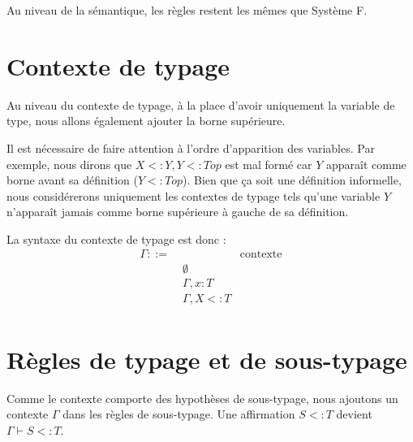 Au niveau de la sémantique, les règles restent les mêmes que Système F.

\label{eval:system-f-sub}

\section{Contexte de typage}

Au niveau du contexte de typage, à la place d'avoir uniquement la variable de
type, nous allons également ajouter la borne supérieure.

Il est nécessaire de faire attention à l'ordre d'apparition des variables. Par
exemple, nous dirons que $X <: Y, Y <: Top$ est mal formé car $Y$
apparaît comme borne avant sa définition ($Y <: Top$). Bien que ça soit une
définition informelle, nous considérerons uniquement les contextes de typage
tels qu'une variable $Y$ n'apparaît jamais comme borne supérieure à gauche de sa
définition.

La syntaxe du contexte de typage est donc :
\begin{align*}
  \Gamma ::= & \, & \text{contexte} \\
        & \; \emptyset & \\
        & \; \Gamma, x : T & \\
        & \; \Gamma, X <: T & \\
\end{align*}

\section{Règles de typage et de sous-typage}

Comme le contexte comporte des hypothèses de sous-typage, nous ajoutons un
contexte $\Gamma$ dans les règles de sous-typage. Une affirmation $S <: T$
devient $\Gamma \vdash S <: T$.

